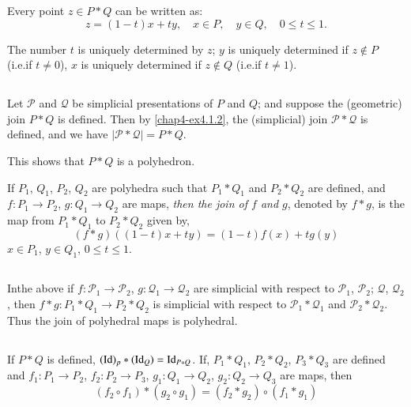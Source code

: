 Every point $z\in P\ast Q$ can be written as:
$$
z=(1-t)x+ty,\quad x\in P,\quad y\in Q,\quad 0\leq t\leq 1.
$$

The number $t$ is uniquely determined by $z$; $y$ is uniquely determined if $z\not\in P$ (i.e.\@ if $t\neq 0$), $x$ is uniquely determined if $z\not\in Q$ (i.e.\@ if $t\neq 1$).

\setcounter{subsection}{1}
\subsection{}\label{chap4-sec4.3.2}
Let $\mathscr{P}$ and $\mathcal{Q}$ be simplicial presentations of $P$ and $Q$; and suppose the (geometric) join $P\ast Q$ is defined. Then by \ref{chap4-ex4.1.2}, the (simplicial) join $\mathscr{P}\ast \mathcal{Q}$ is defined, and we have $|\mathscr{P}\ast\mathcal{Q}|=P\ast Q$.

This shows that $P\ast Q$ is a polyhedron.

\setcounter{proposition}{2}
\begin{definition}\label{chap4-defi4.3.3}
If $P_{1}$, $Q_{1}$, $P_{2}$, $Q_{2}$ are polyhedra such that $P_{1}\ast Q_{1}$ and $P_{2}\ast Q_{2}$ are defined, and $f:P_{1}\to P_{2}$, $g:Q_{1}\to Q_{2}$ are maps, {\em then the join of $f$ and $g$}, denoted by $f\ast g$, is the map from $P_{1}\ast Q_{1}$ to $P_{2}\ast Q_{2}$ given by,
$$
(f\ast g)((1-t)x+ty)=(1-t)f(x)+tg(y)
$$
$x\in P_{1}$, $y\in Q_{1}$, $0\leq t\leq 1$.
\end{definition}

\setcounter{subsection}{3}
\subsection{}\label{chap4-sec4.3.4}
In\pageoriginale the above if $f: \mathcal{P}_{1}\to \mathcal{P}_{2}$, $g:\mathcal{Q}_{1}\to \mathcal{Q}_{2}$ are simplicial with respect to $\mathscr{P}_{1}$, $\mathscr{P}_{2}$; $\mathcal{Q}$, $\mathcal{Q}_{2}$, then $f\ast g:P_{1}\ast Q_{1}\to P_{2}\ast Q_{2}$ is simplicial with respect to $\mathscr{P}_{1}\ast\mathcal{Q}_{1}$ and $\mathscr{P}_{2}\ast\mathcal{Q}_{2}$. Thus the join of polyhedral maps is polyhedral.


\subsection{}\label{chap4-sec4.3.5}
If $P\ast Q$ is defined, $(\operatorname{Id})_{p}\ast(\operatorname{Id}_{Q})=\operatorname{Id}_{P\ast Q}$. If, $P_{1}\ast Q_{1}$, $P_{2}\ast Q_{2}$, $P_{3}\ast Q_{3}$ are defined and $f_{1}:P_{1}\to P_{2}$, $f_{2}:P_{2}\to P_{3}$, $g_{1}:Q_{1}\to Q_{2}$, $g_{2}:Q_{2}\to Q_{3}$ are maps, then
$$
(f_{2}\circ f_{1})\ast (g_{2}\circ g_{1})=(f_{2}\ast g_{2})\circ (f_{1}\ast g_{1})
$$


